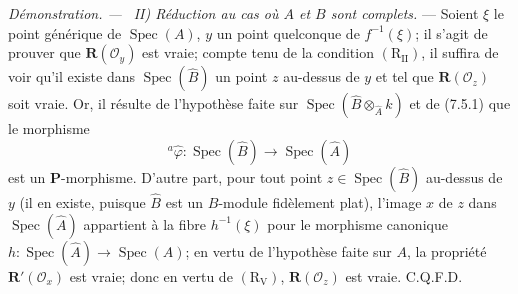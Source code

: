 \documentclass[10pt,oneside]{book}
\newenvironment{proof}{%
  \par\medskip\noindent\textit{Démonstration. ---\ }}{\par}
\begin{document}
\begin{proof}
\emph{II) Réduction au cas où $A$ et $B$ sont complets.} --- Soient $\xi$
le point générique de $\operatorname{Spec}(A)$, $y$ un point quelconque de
$f^{-1}(\xi)$; il s'agit de prouver que
$\boldsymbol R(\mathscr O_y)$ est vraie; compte tenu de la condition
$(\mathrm R_{\mathrm{II}})$, il suffira de voir qu'il existe dans
$\operatorname{Spec}(\widehat B)$ un point $z$ au-dessus de $y$ et tel que
$\boldsymbol R(\mathscr O_z)$ soit vraie. Or, il résulte de l'hypothèse
faite sur $\operatorname{Spec}(\widehat B\otimes_{\widehat A}k)$ et de
(7.5.1) que le morphisme
\[
{}^a\widehat\varphi:\operatorname{Spec}(\widehat B)
\to\operatorname{Spec}(\widehat A)
\]
est un $\boldsymbol P$-morphisme. D'autre part, pour tout point
$z\in\operatorname{Spec}(\widehat B)$ au-dessus de $y$ (il en existe,
puisque $\widehat B$ est un $B$-module fidèlement plat), l'image $x$ de $z$
dans $\operatorname{Spec}(\widehat A)$ appartient à la fibre
$h^{-1}(\xi)$ pour le morphisme canonique
$h:\operatorname{Spec}(\widehat A)\to\operatorname{Spec}(A)$; en vertu de
l'hypothèse faite sur $A$, la propriété
$\boldsymbol R'(\mathscr O_x)$ est vraie; donc en vertu de
$(\mathrm R_{\mathrm V})$, $\boldsymbol R(\mathscr O_z)$ est vraie.
C.Q.F.D.
\end{proof}
\end{document}

